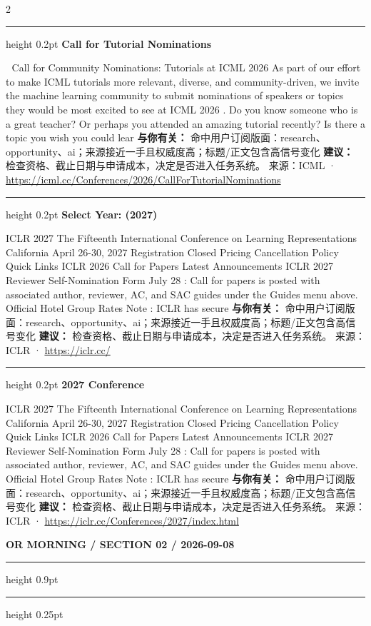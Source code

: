 \documentclass[10.5pt]{ctexart}
\begin{document}
\begin{multicols}{2}
\vspace{2mm}
\hrule height 0.2pt
\vspace{2mm}
{\large\bfseries Call for Tutorial Nominations}\par
📣 Call for Community Nominations: Tutorials at ICML 2026 As part of our effort to make ICML tutorials more relevant, diverse, and community-driven, we invite the machine learning community to submit nominations of speakers or topics they would be most excited to see at ICML 2026 . Do you know someone who is a great teacher? Or perhaps you attended an amazing tutorial recently? Is there a topic you wish you could lear
\textbf{与你有关：} 命中用户订阅版面：research、opportunity、ai；来源接近一手且权威度高；标题/正文包含高信号变化
\textbf{建议：} 检查资格、截止日期与申请成本，决定是否进入任务系统。
{\footnotesize\color{ormuted} 来源：ICML · \url{https://icml.cc/Conferences/2026/CallForTutorialNominations}}
\vspace{2mm}
\hrule height 0.2pt
\vspace{2mm}
{\large\bfseries Select Year: (2027)}\par
ICLR 2027 The Fifteenth International Conference on Learning Representations California April 26-30, 2027 Registration Closed Pricing Cancellation Policy Quick Links ICLR 2026 Call for Papers Latest Announcements ICLR 2027 Reviewer Self-Nomination Form July 28 : Call for papers is posted with associated author, reviewer, AC, and SAC guides under the Guides menu above. Official Hotel Group Rates Note : ICLR has secure
\textbf{与你有关：} 命中用户订阅版面：research、opportunity、ai；来源接近一手且权威度高；标题/正文包含高信号变化
\textbf{建议：} 检查资格、截止日期与申请成本，决定是否进入任务系统。
{\footnotesize\color{ormuted} 来源：ICLR · \url{https://iclr.cc/}}
\vspace{2mm}
\hrule height 0.2pt
\vspace{2mm}
{\large\bfseries 2027 Conference}\par
ICLR 2027 The Fifteenth International Conference on Learning Representations California April 26-30, 2027 Registration Closed Pricing Cancellation Policy Quick Links ICLR 2026 Call for Papers Latest Announcements ICLR 2027 Reviewer Self-Nomination Form July 28 : Call for papers is posted with associated author, reviewer, AC, and SAC guides under the Guides menu above. Official Hotel Group Rates Note : ICLR has secure
\textbf{与你有关：} 命中用户订阅版面：research、opportunity、ai；来源接近一手且权威度高；标题/正文包含高信号变化
\textbf{建议：} 检查资格、截止日期与申请成本，决定是否进入任务系统。
{\footnotesize\color{ormuted} 来源：ICLR · \url{https://iclr.cc/Conferences/2027/index.html}}
\end{multicols}
\newpage
{\small\bfseries OR MORNING / SECTION 02 / 2026-09-08}
\vspace{2mm}
\hrule height 0.9pt
\vspace{1.5mm}
\hrule height 0.25pt
\vspace{4mm}
\end{document}
